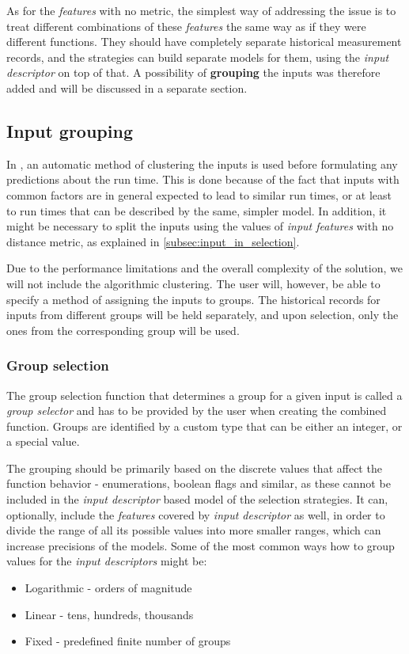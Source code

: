 As for the \textit{features} with no metric, the simplest way of addressing the issue is to treat different combinations of these \textit{features} the same way as if they were different functions. They should have completely separate historical measurement records, and the strategies can build separate models for them, using the \textit{input descriptor} on top of that. A possibility of \textbf{grouping} the inputs was therefore added and will be discussed in a separate section.

\subsection{Input grouping}
\label{subsec:grouping}

In \cite{smith_predicting_1998}, an automatic method of clustering the inputs is used before formulating any predictions about the run time. This is done because of the fact that inputs with common factors are in general expected to lead to similar run times, or at least to run times that can be described by the same, simpler model. In addition, it might be necessary to split the inputs using the values of \textit{input features} with no distance metric, as explained in \ref{subsec:input_in_selection}.

Due to the performance limitations and the overall complexity of the solution, we will not include the algorithmic clustering. The user will, however, be able to specify a method of assigning the inputs to groups. The historical records for inputs from different groups will be held separately, and upon selection, only the ones from the corresponding group will be used.

\subsubsection{Group selection}
\label{subsubsec:group_selection}

The group selection function that determines a group for a given input is called a \textit{group selector} and has to be provided by the user when creating the combined function. Groups are identified by a custom type that can be either an integer, or a special  value. 

The grouping should be primarily based on the discrete values that affect the function behavior - enumerations, boolean flags and similar, as these cannot be included in the \textit{input descriptor} based model of the selection strategies. It can, optionally, include the \textit{features} covered by \textit{input descriptor} as well, in order to divide the range of all its possible values into more smaller ranges, which can increase precisions of the models. Some of the most common ways how to group values for the \textit{input descriptors} might be:
\begin{itemize}
	\item Logarithmic - orders of magnitude
	\item Linear - tens, hundreds, thousands
	\item Fixed - predefined finite number of groups
\end{itemize}

